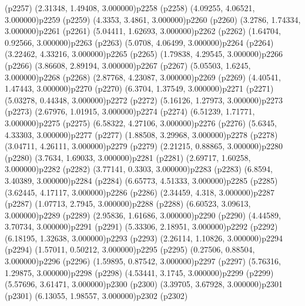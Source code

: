 \psdot(p2257)
\psPoint(2.31348, 1.49408, 3.000000){p2258}
\psdot(p2258)
\psPoint(4.09255, 4.06521, 3.000000){p2259}
\psdot(p2259)
\psPoint(4.3353, 3.4861, 3.000000){p2260}
\psdot(p2260)
\psPoint(3.2786, 1.74334, 3.000000){p2261}
\psdot(p2261)
\psPoint(5.04411, 1.62693, 3.000000){p2262}
\psdot(p2262)
\psPoint(1.64704, 0.92566, 3.000000){p2263}
\psdot(p2263)
\psPoint(5.0708, 4.06499, 3.000000){p2264}
\psdot(p2264)
\psPoint(3.22462, 4.33216, 3.000000){p2265}
\psdot(p2265)
\psPoint(1.79838, 4.29545, 3.000000){p2266}
\psdot(p2266)
\psPoint(3.86608, 2.89194, 3.000000){p2267}
\psdot(p2267)
\psPoint(5.05503, 1.6245, 3.000000){p2268}
\psdot(p2268)
\psPoint(2.87768, 4.23087, 3.000000){p2269}
\psdot(p2269)
\psPoint(4.40541, 1.47443, 3.000000){p2270}
\psdot(p2270)
\psPoint(6.3704, 1.37549, 3.000000){p2271}
\psdot(p2271)
\psPoint(5.03278, 0.44348, 3.000000){p2272}
\psdot(p2272)
\psPoint(5.16126, 1.27973, 3.000000){p2273}
\psdot(p2273)
\psPoint(2.67976, 1.01915, 3.000000){p2274}
\psdot(p2274)
\psPoint(6.51239, 1.71771, 3.000000){p2275}
\psdot(p2275)
\psPoint(6.58322, 4.27106, 3.000000){p2276}
\psdot(p2276)
\psPoint(5.6345, 4.33303, 3.000000){p2277}
\psdot(p2277)
\psPoint(1.88508, 3.29968, 3.000000){p2278}
\psdot(p2278)
\psPoint(3.04711, 4.26111, 3.000000){p2279}
\psdot(p2279)
\psPoint(2.21215, 0.88865, 3.000000){p2280}
\psdot(p2280)
\psPoint(3.7634, 1.69033, 3.000000){p2281}
\psdot(p2281)
\psPoint(2.69717, 1.60258, 3.000000){p2282}
\psdot(p2282)
\psPoint(3.77141, 0.3303, 3.000000){p2283}
\psdot(p2283)
\psPoint(6.8594, 3.40389, 3.000000){p2284}
\psdot(p2284)
\psPoint(6.65773, 4.51333, 3.000000){p2285}
\psdot(p2285)
\psPoint(3.62445, 4.17117, 3.000000){p2286}
\psdot(p2286)
\psPoint(2.34459, 4.318, 3.000000){p2287}
\psdot(p2287)
\psPoint(1.07713, 2.7945, 3.000000){p2288}
\psdot(p2288)
\psPoint(6.60523, 3.09613, 3.000000){p2289}
\psdot(p2289)
\psPoint(2.95836, 1.61686, 3.000000){p2290}
\psdot(p2290)
\psPoint(4.44589, 3.70734, 3.000000){p2291}
\psdot(p2291)
\psPoint(5.33306, 2.18951, 3.000000){p2292}
\psdot(p2292)
\psPoint(6.18195, 1.32638, 3.000000){p2293}
\psdot(p2293)
\psPoint(2.26114, 1.10826, 3.000000){p2294}
\psdot(p2294)
\psPoint(1.57011, 0.50212, 3.000000){p2295}
\psdot(p2295)
\psPoint(0.27506, 0.88504, 3.000000){p2296}
\psdot(p2296)
\psPoint(1.59895, 0.87542, 3.000000){p2297}
\psdot(p2297)
\psPoint(5.76316, 1.29875, 3.000000){p2298}
\psdot(p2298)
\psPoint(4.53441, 3.1745, 3.000000){p2299}
\psdot(p2299)
\psPoint(5.57696, 3.61471, 3.000000){p2300}
\psdot(p2300)
\psPoint(3.39705, 3.67928, 3.000000){p2301}
\psdot(p2301)
\psPoint(6.13055, 1.98557, 3.000000){p2302}
\psdot(p2302)
